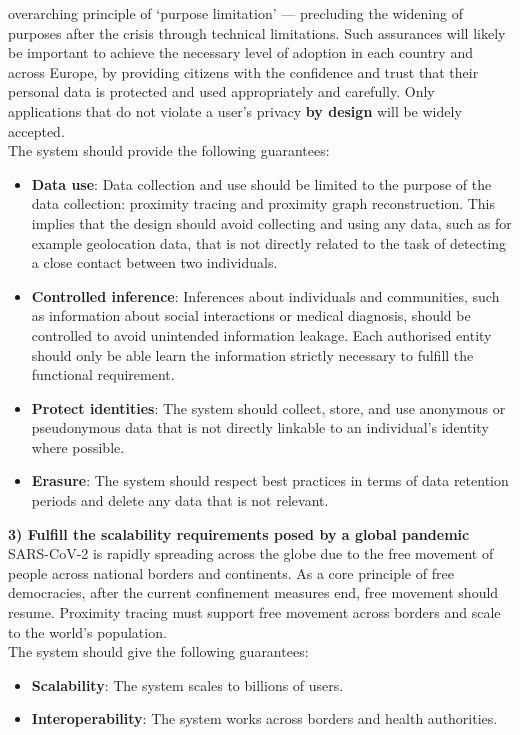 \documentclass[12pt,a4paper]{article}
\begin{document}
overarching principle of ‘purpose limitation’ — precluding the widening of purposes after the crisis through technical limitations. Such assurances will likely be important to achieve the necessary level of adoption in each country and across Europe, by providing citizens with the confidence and trust that their personal data is protected and used appropriately and carefully. Only applications that do not violate a user’s privacy \textbf{by design} will be widely accepted.\\[0.3cm]
The system should provide the following guarantees:
\begin{itemize}\itemsep0pt
\item \textbf{Data use}: Data collection and use should be limited to the purpose of the data collection: proximity tracing and proximity graph reconstruction. This implies that the design should avoid collecting and using any data, such as for example geolocation
data, that is not directly related to the task of detecting a close contact between two
individuals.
\item \textbf{Controlled inference}: Inferences about individuals and communities, such as
information about social interactions or medical diagnosis, should be controlled to
avoid unintended information leakage. Each authorised entity should only be able
learn the information strictly necessary to fulfill the functional requirement.
\item \textbf{Protect identities}: The system should collect, store, and use anonymous or
pseudonymous data that is not directly linkable to an individual’s identity where
possible.
\item \textbf{Erasure}: The system should respect best practices in terms of data retention periods and delete any data that is not relevant.
\end{itemize}
\textbf{3) Fulfill the scalability requirements posed by a global pandemic}\\
SARS-CoV-2 is rapidly spreading across the globe due to the free movement of people
across national borders and continents. As a core principle of free democracies, after the
current confinement measures end, free movement should resume. Proximity tracing must
support free movement across borders and scale to the world’s population.\\[0.3cm]
The system should give the following guarantees:
\begin{itemize}\itemsep0pt
\item \textbf{Scalability}:  The system scales to billions of users.
\item \textbf{Interoperability}:  The system works across borders and health authorities.
\end{itemize}
\end{document}

